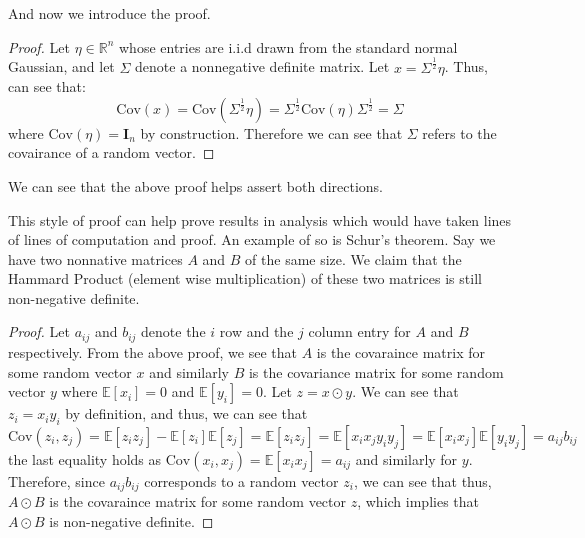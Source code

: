 \documentclass[12pt]{article}
\newcommand{\R}{\mathbb{R}}
\newcommand{\E}{\mathbb{E}}
\newcommand{\Cov}{\text{Cov}}
\begin{document}
\noindent
And now we introduce the proof. 
\begin{proof}
Let $\eta \in \R^n$ whose entries are i.i.d drawn from the standard normal Gaussian, and let $\Sigma$ denote a nonnegative definite matrix. Let $x = \Sigma^\frac{1}{2} \eta$. Thus, can see that:
\[
	\Cov(x) = \Cov(\Sigma^\frac{1}{2} \eta) = \Sigma^\frac{1}{2} \Cov(\eta) \Sigma^\frac{1}{2} = \Sigma 
\]
where $\Cov(\eta) = \mathbf{I}_n$ by construction. Therefore we can see that $\Sigma$ refers to the covairance of a random vector. 
\end{proof}
We can see that the above proof helps assert both directions. 

This style of proof can help prove results in analysis which would have taken lines of lines of computation and proof. An example of so is Schur's theorem. Say we have two nonnative matrices $A$ and $B$ of the same size. We claim that the Hammard Product (element wise multiplication) of these two matrices is still non-negative definite. 

\begin{proof}
	Let $a_{ij}$ and $b_{ij}$ denote the $i$ row and the $j$ column entry for $A$ and $B$ respectively. From the above proof, we see that $A$ is the covaraince matrix for some random vector $x$ and similarly $B$ is the covariance matrix for some random vector $y$ where $\E[x_i] = 0$ and $\E[y_i] = 0$.
	Let $z = x \odot y$. We can see that $z_i = x_i y_i$ by definition, and thus, we can see that 
	\[
		\Cov(z_i, z_j) = \E[z_i z_j] - \E[z_i]\E[z_j] = \E[z_i z_j] = \E[x_ix_jy_iy_j] = \E[x_i x_j] \E[y_i y_j] = a_{ij} b_{ij}
	\]
	the last equality holds as $\Cov(x_i, x_j) = \E[x_i x_j] = a_{ij}$ and similarly for $y$. Therefore, since $a_{ij} b_{ij}$ corresponds to a random vector $z_i$, we can see that thus, $A \odot B$ is the covaraince matrix for some random vector $z$, which implies that $A \odot B$ is non-negative definite. 
\end{proof}
\end{document}
